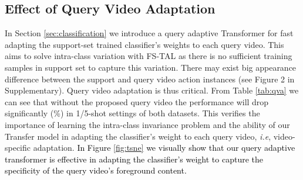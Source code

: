 \documentclass{bmvc2k}
\def\ie{\emph{i.e}\bmvaOneDot}
\begin{document}
\subsection{Effect of Query Video Adaptation}
In Section \ref{sec:classification}
we introduce a query adaptive Transformer
for fast adapting the support-set trained classifier's weights to each query video.
This aims to solve intra-class variation with FS-TAL 
as there is no sufficient training samples in support set to capture
this variation.
There may exist big appearance difference between the support and query video action instances
(see Figure 2 in Supplementary). 
Query video adaptation is thus critical.
From Table \ref{tab:qva} we can see that without the proposed query video the performance will drop significantly (\%) in 1/5-shot settings of both datasets. 
This verifies the importance of learning the intra-class invariance problem and the ability of our Transfer model in adapting the classifier's weight to each query video, \ie, video-specific adaptation.
\textcolor{black}{In Figure \ref{fig:tsne} we visually show that our query adaptive transformer is effective in adapting the classifier's weight to capture the specificity of the query video's foreground content.}



\begin{table}[!hbt]
\centering
{}
\vspace{0.15in}
\caption{\textbf{Effect of query video adaptation (QVA)} in the multi-instance setting.
}
\label{tab:qva}
\vspace{-0.2cm}
\end{table}
\end{document}

